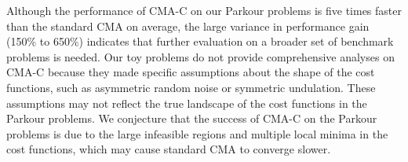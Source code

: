 Although the performance of CMA-C on our Parkour problems is
five times faster than the standard CMA on average, the large
variance in performance gain (150\% to 650\%) indicates that further
evaluation on a broader set of benchmark problems is needed. Our toy
problems do not provide comprehensive analyses on CMA-C because they
made specific assumptions about the shape of the cost functions,
such as asymmetric random noise or symmetric undulation. These
assumptions may not reflect the true landscape of the cost functions
in the Parkour problems. We conjecture that the success of CMA-C on the
Parkour problems is due to the large infeasible regions and multiple
local minima in the cost functions, which may cause standard CMA to
converge slower.






